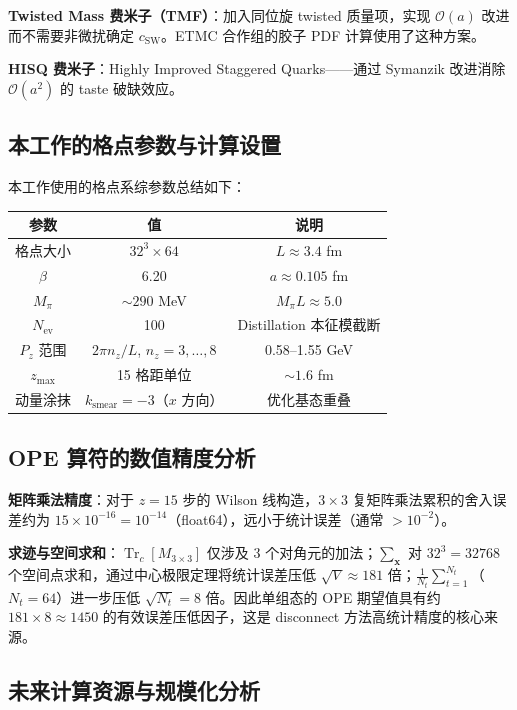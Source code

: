 \documentclass[11pt,a4paper]{ctexart}
\newcommand{\tr}{\operatorname{Tr}}
\newcommand{\order}[1]{\mathcal{O}(#1)}
\begin{document}
\textbf{Twisted Mass 费米子（TMF）}：加入同位旋 twisted 质量项，实现 $\order{a}$ 改进而不需要非微扰确定 $c_{\text{SW}}$。ETMC 合作组的胶子 PDF 计算使用了这种方案。

\textbf{HISQ 费米子}：Highly Improved Staggered Quarks——通过 Symanzik 改进消除 $\order{a^2}$ 的 taste 破缺效应。

\subsection{本工作的格点参数与计算设置}

本工作使用的格点系综参数总结如下：

\begin{center}
\begin{tabular}{c c c}
\toprule
\textbf{参数} & \textbf{值} & \textbf{说明} \\
\midrule
格点大小 & $32^3 \times 64$ & $L \approx 3.4$ fm \\
$\beta$ & 6.20 & $a \approx 0.105$ fm \\
$M_\pi$ & $\sim 290$ MeV & $M_\pi L \approx 5.0$ \\
$N_{\text{ev}}$ & 100 & Distillation 本征模截断 \\
$P_z$ 范围 & $2\pi n_z / L$, $n_z = 3,\ldots,8$ & 0.58--1.55 GeV \\
$z_{\text{max}}$ & 15 格距单位 & $\sim 1.6$ fm \\
动量涂抹 & $k_{\text{smear}} = -3$（$x$ 方向） & 优化基态重叠 \\
\bottomrule
\end{tabular}
\end{center}

\subsection{OPE 算符的数值精度分析}

\textbf{矩阵乘法精度}：对于 $z=15$ 步的 Wilson 线构造，$3\times 3$ 复矩阵乘法累积的舍入误差约为 $15 \times 10^{-16} = 10^{-14}$（float64），远小于统计误差（通常 $>10^{-2}$）。

\textbf{求迹与空间求和}：$\tr_c[M_{3\times3}]$ 仅涉及 3 个对角元的加法；$\sum_{\mathbf{x}}$ 对 $32^3 = 32768$ 个空间点求和，通过中心极限定理将统计误差压低 $\sqrt{V} \approx 181$ 倍；$\frac{1}{N_t} \sum_{t=1}^{N_t}$（$N_t=64$）进一步压低 $\sqrt{N_t} = 8$ 倍。因此单组态的 OPE 期望值具有约 $181 \times 8 \approx 1450$ 的有效误差压低因子，这是 disconnect 方法高统计精度的核心来源。

\subsection{未来计算资源与规模化分析}
\end{document}
